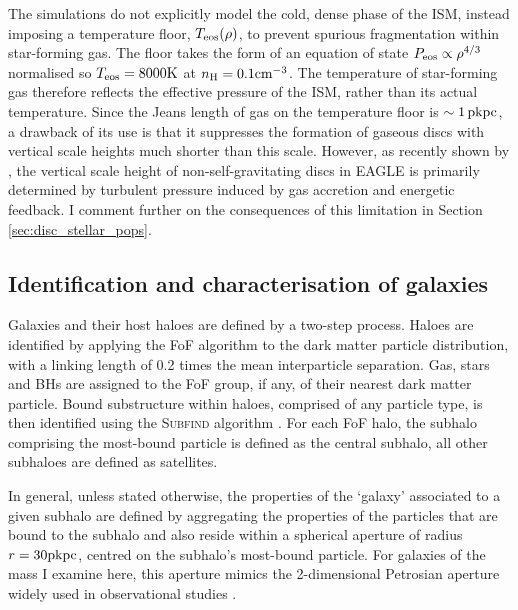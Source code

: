 The simulations do not explicitly model the cold, dense phase of the ISM, instead imposing a temperature floor, $T_{\rm eos}(\rho)$, to prevent spurious fragmentation within star-forming gas. The floor takes the form of an equation of state $P_{\rm eos} \propto \rho^{4/3}$ normalised so $T_{\rm eos} = 8000 {\rm K}$ at $n_{\rm H} = 0.1 {\rm cm}^{-3}$. The temperature of star-forming gas therefore reflects the effective pressure of the ISM, rather than its actual temperature. Since the Jeans length of gas on the temperature floor is $\sim 1\,{\rm pkpc}$, a drawback of its use is that it suppresses the formation of gaseous discs with vertical scale heights much shorter than this scale. However, as recently shown by \citet{2018MNRAS.473.1019B}, the vertical scale height of non-self-gravitating discs in EAGLE is primarily determined by turbulent pressure induced by gas accretion and energetic feedback. I comment further on the consequences of this limitation in Section \ref{sec:disc_stellar_pops}. 

\subsection{Identification and characterisation of galaxies}
\label{sec:finding_galaxies}
Galaxies and their host haloes are defined by a two-step process. Haloes are identified by applying the FoF algorithm to the dark matter particle distribution, with a linking length of 0.2 times the mean interparticle separation. Gas, stars and BHs are assigned to the FoF group, if any, of their nearest dark matter particle. Bound substructure within haloes, comprised of any particle type, is then identified using the \textsc{Subfind} algorithm \citep{2001MNRAS.328..726S,2009MNRAS.399..497D}. For each FoF halo, the subhalo comprising the most-bound particle is defined as the central subhalo, all other subhaloes are defined as satellites.

In general, unless stated otherwise, the properties of the `galaxy' associated to a given subhalo are defined by aggregating the properties of the particles that are bound to the subhalo and also reside within a spherical aperture of radius $r = 30 {\rm pkpc}$, centred on the subhalo's most-bound particle. For galaxies of the mass I examine here, this aperture mimics the 2-dimensional Petrosian aperture widely used in observational studies \citep[see][]{2015MNRAS.446..521S}.

